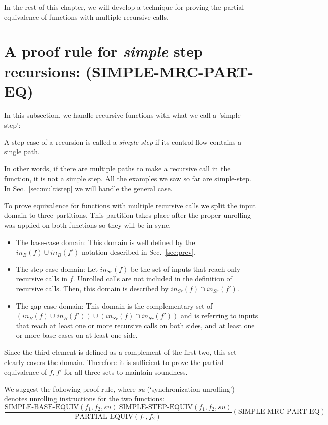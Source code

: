 In the rest of this chapter, we will develop a technique for proving the partial equivalence of functions with multiple recursive calls.

\section{A proof rule for \emph{simple} step recursions: (SIMPLE-MRC-PART-EQ) }
\label{sec:adaptstep}
In this subsection, we handle recursive functions with what we call a 'simple step': 
\begin{definition} \label{def:simple}
A step case of a recursion is called a \emph{simple step} if its control flow contains a single path.
\end{definition}
In other words, if there are multiple paths to make a recursive call in the function, it is not a simple step. All the examples we saw so far are simple-step. In Sec.~\ref{sec:multistep} we will handle the general case. 

To prove equivalence for functions with multiple recursive calls we split the input domain to three partitions. This partition takes place after the proper unrolling was applied on both functions so they will be in sync.
\begin{itemize}
    \item The base-case domain: This domain is well defined by the $in_B(f) \cup in_B(f')$ notation described in Sec.~\ref{sec:prev}.
    \item The step-case domain: Let $in_{Sr}(f)$ be the set of inputs that reach only recursive calls in $f$. Unrolled calls are not included in the definition of recursive calls. Then, this domain is described by $in_{Sr}(f) \cap in_{Sr}(f')$.
    \item The gap-case domain: This domain is the complementary set of $(in_B(f) \cup in_B(f')) \cup (in_{Sr}(f) \cap in_{Sr}(f'))$ and is referring to inputs that reach at least one or more recursive calls on both sides, and at least one or more base-cases on at least one side.
\end{itemize}
Since the third element is defined as a complement of the first two, this set clearly covers the domain. Therefore it is sufficient to prove the partial equivalence of $f,f'$ for all three sets to maintain soundness. 

We suggest the following proof rule, where  \emph{su} (`synchronization unrolling') denotes unrolling instructions for the two functions:
\begin{equation}
 {\frac {\text{SIMPLE-BASE-EQUIV}(f_1,f_2,su) \:\text{SIMPLE-STEP-EQUIV}(f_1,f_2,su)}{\text{PARTIAL-EQUIV}(f_1,f_2)}} 
  (\text{SIMPLE-MRC-PART-EQ})
\end{equation}

